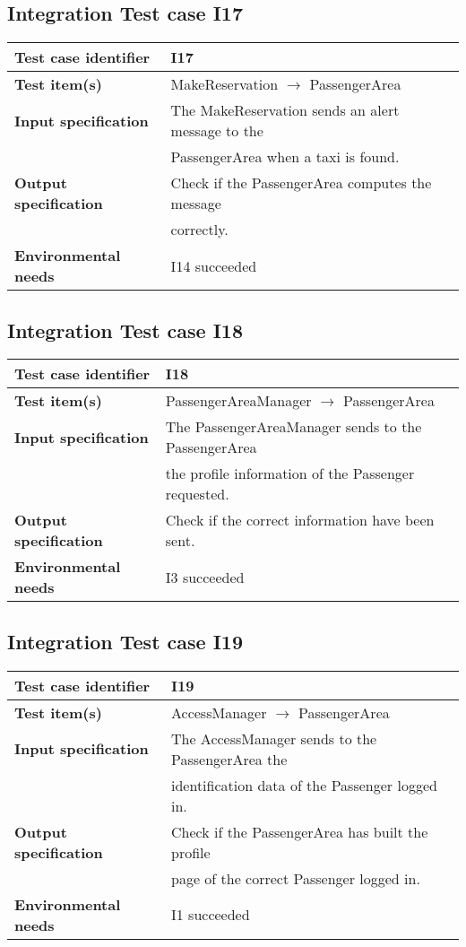 \documentclass[18pt,oneside,a4paper, titlepage]{article}
\begin{document}
	\subsection{Integration Test case I17}
		\begin{tabular}{ l l}
			\hline 		\textbf{Test case identifier} & I17 \\
			\hline		\textbf{Test item(s)}  & MakeReservation $\rightarrow$ PassengerArea \\
			\hline		\textbf{Input specification} & The MakeReservation sends an alert message to the\\ & PassengerArea when a taxi is found.\\
			\hline		\textbf{Output specification} &  Check if the PassengerArea computes the message\\ & correctly.\\
			\hline		\textbf{Environmental needs} & I14 succeeded\\
			\hline
		\end{tabular}
	\subsection{Integration Test case I18}
		\begin{tabular}{ l l}
			\hline 		\textbf{Test case identifier} & I18 \\
			\hline		\textbf{Test item(s)}  & PassengerAreaManager $\rightarrow$ PassengerArea \\
			\hline		\textbf{Input specification} & The PassengerAreaManager sends to the PassengerArea\\ & the profile information of the Passenger requested.\\
			\hline		\textbf{Output specification} & Check if the correct information have been sent.\\
			\hline		\textbf{Environmental needs} & I3 succeeded\\
			\hline
		\end{tabular}
	\subsection{Integration Test case I19}
		\begin{tabular}{ l l}
			\hline 		\textbf{Test case identifier} & I19 \\
			\hline		\textbf{Test item(s)}  & AccessManager $\rightarrow$ PassengerArea \\
			\hline		\textbf{Input specification} &  The AccessManager sends to the PassengerArea the\\ & identification data of the Passenger logged in.\\
			\hline		\textbf{Output specification} & Check if the PassengerArea has built the profile\\ & page of the correct Passenger logged in.\\
			\hline		\textbf{Environmental needs} & I1 succeeded\\
			\hline
		\end{tabular}
\end{document}
